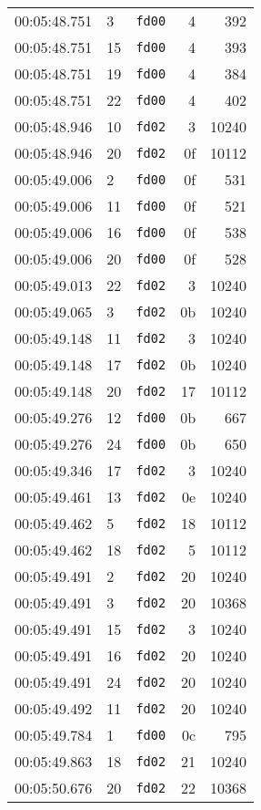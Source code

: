 \documentclass{article}
\begin{document}
\begin{longtable}{lllrr}
00:05:48.751 & 3 & \texttt{fd00} & 4 & 392 \\
00:05:48.751 & 15 & \texttt{fd00} & 4 & 393 \\
00:05:48.751 & 19 & \texttt{fd00} & 4 & 384 \\
00:05:48.751 & 22 & \texttt{fd00} & 4 & 402 \\
00:05:48.946 & 10 & \texttt{fd02} & 3 & 10240 \\
00:05:48.946 & 20 & \texttt{fd02} & 0f & 10112 \\
00:05:49.006 & 2 & \texttt{fd00} & 0f & 531 \\
00:05:49.006 & 11 & \texttt{fd00} & 0f & 521 \\
00:05:49.006 & 16 & \texttt{fd00} & 0f & 538 \\
00:05:49.006 & 20 & \texttt{fd00} & 0f & 528 \\
00:05:49.013 & 22 & \texttt{fd02} & 3 & 10240 \\
00:05:49.065 & 3 & \texttt{fd02} & 0b & 10240 \\
00:05:49.148 & 11 & \texttt{fd02} & 3 & 10240 \\
00:05:49.148 & 17 & \texttt{fd02} & 0b & 10240 \\
00:05:49.148 & 20 & \texttt{fd02} & 17 & 10112 \\
00:05:49.276 & 12 & \texttt{fd00} & 0b & 667 \\
00:05:49.276 & 24 & \texttt{fd00} & 0b & 650 \\
00:05:49.346 & 17 & \texttt{fd02} & 3 & 10240 \\
00:05:49.461 & 13 & \texttt{fd02} & 0e & 10240 \\
00:05:49.462 & 5 & \texttt{fd02} & 18 & 10112 \\
00:05:49.462 & 18 & \texttt{fd02} & 5 & 10112 \\
00:05:49.491 & 2 & \texttt{fd02} & 20 & 10240 \\
00:05:49.491 & 3 & \texttt{fd02} & 20 & 10368 \\
00:05:49.491 & 15 & \texttt{fd02} & 3 & 10240 \\
00:05:49.491 & 16 & \texttt{fd02} & 20 & 10240 \\
00:05:49.491 & 24 & \texttt{fd02} & 20 & 10240 \\
00:05:49.492 & 11 & \texttt{fd02} & 20 & 10240 \\
00:05:49.784 & 1 & \texttt{fd00} & 0c & 795 \\
00:05:49.863 & 18 & \texttt{fd02} & 21 & 10240 \\
00:05:50.676 & 20 & \texttt{fd02} & 22 & 10368 \\

\end{longtable}
\end{document}
